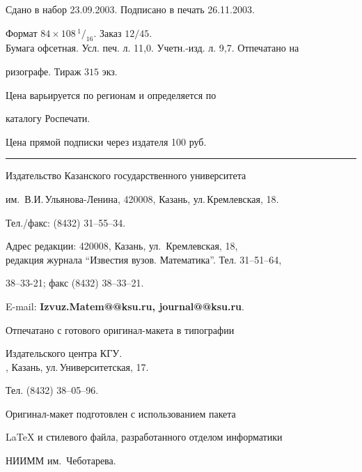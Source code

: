 \noindent Сдано в набор 23.09.2003. Подписано в печать 26.11.2003.


Формат $84\times 108 \,^1/_{16}.$ Заказ $12/45$.\\


Бумага офсетная. Усл. печ. л. 11,0. Учетн.-изд. л. 9,7. Отпечатано на 


ризографе. Тираж $315$ экз. 





\noindent Цена варьируется по регионам и определяется по 


каталогу Роспечати. 





\noindent Цена прямой подписки через издателя 100 руб. 


\bigskip


\hrule


\bigskip


\noindent Издательство Казанского государственного университета


им.~В.И.\,Ульянова-Ленина, 420008, Казань, ул.\,Кремлевская, 18.


Тел./факс: (8432) 31--55--34.\\


\smallskip





\noindent Адрес редакции: 420008, Казань, ул.~Кремлевская, 18,\\  


редакция журнала  ``Известия вузов. Математика''. Тел. 31--51--64,


38--33-21; факс (8432) 38--33--21.





\noindent E-mail: {\bf Izvuz.Matem@@ksu.ru, journal@@ksu.ru}. \par


\bigskip 


\noindent Отпечатано с готового оригинал-макета в типографии


Издательского центра КГУ. \\





, Казань, ул.\,Университетская, 17.


Тел. (8432) 38--05--96. \par


\bigskip


\noindent Оригинал-макет подготовлен с использованием пакета


\AmS\LaTeX{} и стилевого файла, разработанного отделом информатики


НИИММ им.~Чеботарева.








